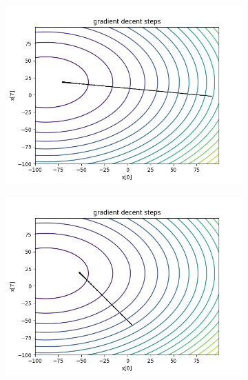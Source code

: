 	\begin{figure}[h!]
		\centering
		\begin{subfigure}[b]{0.45\linewidth}
			\includegraphics[width=\linewidth]{photos/f1_1_1.png}
		\end{subfigure}
		\begin{subfigure}[b]{0.45\linewidth}
			\includegraphics[width=\linewidth]{photos/f1_2_1.png}
		\end{subfigure}
		\begin{subfigure}[b]{0.45\linewidth}

\end{subfigure}
\end{figure}
